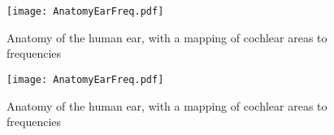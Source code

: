 \documentclass[a4paper]{article}
\begin{document}
\begin{wrapfigure}{r}{0.725\textwidth}
\centering%
\texttt{[image: AnatomyEarFreq.pdf]}%
\caption[Anatomy of the human ear]{Anatomy of the human ear, with a mapping of cochlear areas to frequencies}\label{fig:AnatomyEarFreq}%
\end{wrapfigure}


\lipsum[1]

\begin{figure}[!h]
\centering%
\texttt{[image: AnatomyEarFreq.pdf]}%
\caption[Anatomy of the human ear]{Anatomy of the human ear, with a mapping of cochlear areas to frequencies}\label{fig:AnatomyEarFreq2}%
\end{figure}
\end{document}
